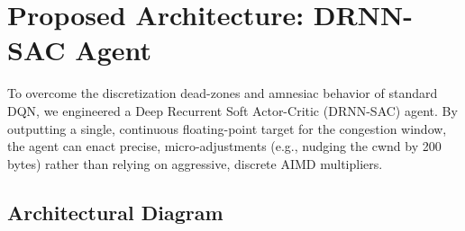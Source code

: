\documentclass[12pt, a4paper]{article}
\begin{document}
\section{Proposed Architecture: DRNN-SAC Agent}

To overcome the discretization dead-zones and amnesiac behavior of standard DQN, we engineered a Deep Recurrent Soft Actor-Critic (DRNN-SAC) agent. By outputting a single, continuous floating-point target for the congestion window, the agent can enact precise, micro-adjustments (e.g., nudging the cwnd by 200 bytes) rather than relying on aggressive, discrete AIMD multipliers.

\subsection{Architectural Diagram}
\end{document}
